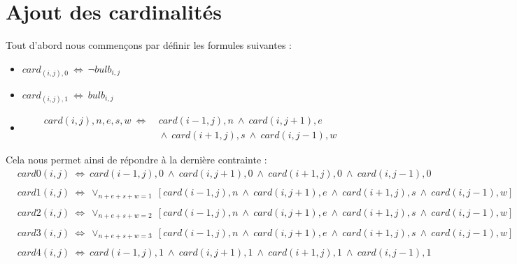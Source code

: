 \documentclass{article}
\begin{document}
\section{Ajout des cardinalit\'es}

Tout d'abord nous commen\c{c}ons par d\'efinir les formules suivantes :
\begin{itemize}
\item $ card_{(i,j),0} ~ \Leftrightarrow ~ \neg bulb_{i,j} $
\item $ card_{(i,j),1} ~ \Leftrightarrow ~ bulb_{i,j} $
\item 
\begin{align}
\nonumber card(i,j),n,e,s,w ~ \Leftrightarrow &~card(i-1,j),n ~ \wedge ~ card(i,j+1),e
\\ 
\nonumber
&~ \wedge ~ card(i+1,j),s ~ \wedge ~ card(i,j-1),w 
\end{align}
\end{itemize}
Cela nous permet ainsi de r\'epondre à la derni\`ere contrainte :
\begin{align}
\nonumber
&card0(i,j) ~ \Leftrightarrow ~ card(i-1,j),0 ~ \wedge ~ card(i,j+1),0~ \wedge ~ card(i+1,j),0 ~ \wedge ~ card(i,j-1),0\\
\nonumber
\\
\nonumber
&card1(i,j) ~ \Leftrightarrow ~ \vee_{n+e+s+w = 1} ~ [card(i-1,j),n ~ \wedge ~ card(i,j+1),e ~ \wedge ~ card(i+1,j),s ~ \wedge ~ card(i,j-1),w]\\
\nonumber
\\
\nonumber
&card2(i,j) ~ \Leftrightarrow ~ \vee_{n+e+s+w = 2} ~ [card(i-1,j),n ~ \wedge ~ card(i,j+1),e~ \wedge ~ card(i+1,j),s ~ \wedge ~ card(i,j-1),w]\\
\nonumber
\\
\nonumber
&card3(i,j) ~ \Leftrightarrow ~ \vee_{n+e+s+w = 3} ~ [card(i-1,j),n ~ \wedge ~ card(i,j+1),e~ \wedge ~ card(i+1,j),s ~ \wedge ~ card(i,j-1),w]\\
\nonumber
\\
\nonumber
&card4(i,j) ~ \Leftrightarrow ~ card(i-1,j),1 ~ \wedge ~ card(i,j+1),1 ~ \wedge ~ card(i+1,j),1 ~ \wedge ~ card(i,j-1),1\\
\nonumber
\end{align}
\end{document}
